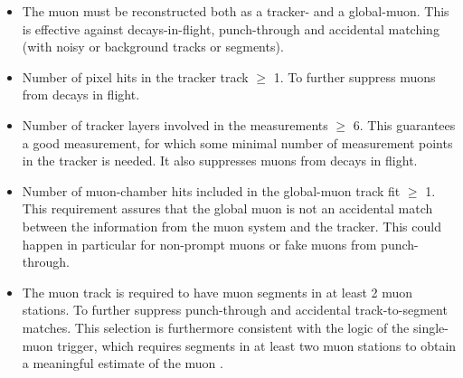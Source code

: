 \begin{itemize}
\item The muon must be reconstructed both as a tracker- and a global-muon. This is effective against decays-in-flight, punch-through and accidental matching (with noisy or background tracks or segments).
\item Number of pixel hits in the tracker track $\geq$ 1. To further suppress muons from decays in flight.
\item Number of tracker layers involved in the measurements $\geq$ 6. This guarantees a good \pt measurement, for which some minimal number of measurement points in the tracker is needed. It also suppresses muons from decays in flight.
\item Number of muon-chamber hits included in the global-muon track fit $\geq$ 1. This requirement assures that the global muon is not an accidental match between the information from the muon system and the tracker. This could happen in particular for non-prompt muons or fake muons from punch-through.
\item The muon track is required to have muon segments in at least 2 muon stations. To further suppress punch-through and accidental track-to-segment matches. This selection is furthermore consistent with the logic of the single-muon trigger, which requires segments in at least two muon stations to obtain a meaningful estimate of the muon \pt.

\end{itemize}
